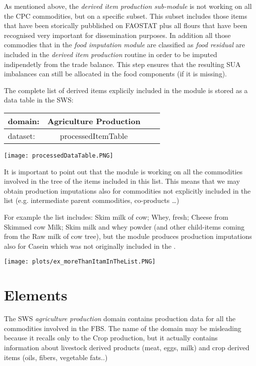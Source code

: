 \documentclass[nojss]{jss}
\begin{document}
As mentioned above, the \textit{derived item production sub-module} is not working on all the CPC commodities, but on a specific subset.
This subset includes those items that have been storically pubblished on FAOSTAT plus all flours that have been recognised very important for dissemination purposes. In addition all those commodies that in the \textit{food imputation module} are classified as \textit{food residual} are included in the \textit{derived item production} routine in order to be imputed indipendetly from the trade balance. This step ensures that the resulting SUA imbalances can still be allocated in the food components (if it is missing).

The complete list of derived items explicily  included in the module is stored as a data table in the SWS: 


\begin{tabular}{|l|c|r|p{1.7cm}|}
  \hline
   domain: & Agriculture Production\\
  \hline
   dataset: & processedItemTable\\
  \hline
\end{tabular}



\texttt{[image: processedDataTable.PNG]}



It is important to point out that the module is working on all the commodities involved in the tree of the items included in this list. This means that we may obtain production imputations also for commodities not explicitly included in the list (e.g. intermediate parent commodities, co-products \dots)

For example the list includes: Skim milk of cow; Whey, fresh; Cheese from Skimmed cow Milk; Skim milk and whey powder (and other child-items coming from the Raw milk of cow tree), but the module produces production imputations also for Casein which was not originally included in the .


\texttt{[image: plots/ex\_moreThanItamInTheList.PNG]}



\section{Elements}

The SWS \textit{agriculture production} domain contains production data for all the commodities involved in the FBS. The name of the domain may be misleading because it recalls only to the Crop production, but it actually contains information about livestock derived products (meat, eggs, milk) and crop derived items (oils, fibers, vegetable fats..)
\end{document}
